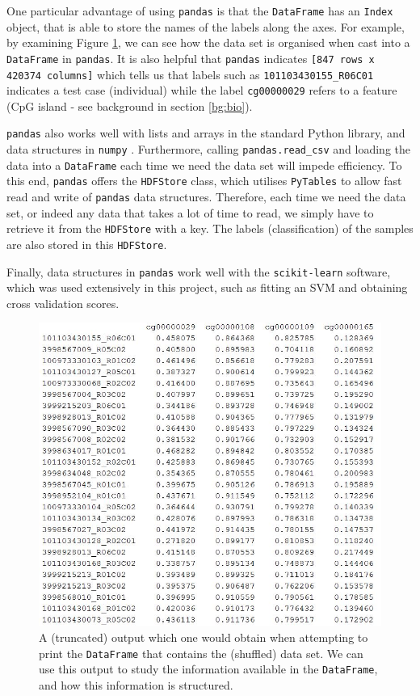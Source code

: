 \documentclass[12pt, twoside, a4paper]{report}
\begin{document}
One particular advantage of using \texttt{pandas} is that the \texttt{DataFrame} has an \texttt{Index} object, that is able to store the names of the labels along the axes. For example, by examining Figure \ref{data:pandas:example}, we can see how the data set is organised when cast into a \texttt{DataFrame} in \texttt{pandas}. It is also helpful that \texttt{pandas} indicates \texttt{[847 rows x 420374 columns]} which tells us that labels such as \texttt{101103430155\_R06C01} indicates a test case (individual) while the label \texttt{cg00000029} refers to a feature (CpG island - see background in section \ref{bg:bio}).

\texttt{pandas} also works well with lists and arrays in the standard Python library, and data structures in \texttt{numpy} \cite{RefWorks:214}. Furthermore, calling \texttt{pandas.read\_csv} and loading the data into a \texttt{DataFrame} each time we need the data set will impede efficiency. To this end, \texttt{pandas} offers the \texttt{HDFStore} class, which utilises \texttt{PyTables} \cite{pytables} to allow fast read and write of \texttt{pandas} data structures. Therefore, each time we need the data set, or indeed any data that takes a lot of time to read, we simply have to retrieve it from the \texttt{HDFStore} with a key. The labels (classification) of the samples are also stored in this \texttt{HDFStore}.

Finally, data structures in  \texttt{pandas} work well with the \texttt{scikit-learn} software, which was used extensively in this project, such as fitting an SVM and obtaining cross validation scores.

\begin{figure}
\centering
\includegraphics[scale=0.9]{images/pandas-example.JPG}
\caption{A (truncated) output which one would obtain when attempting to print the \texttt{DataFrame} that contains the (shuffled) data set. We can use this output to study the information available in the \texttt{DataFrame}, and how this information is structured.}
\label{data:pandas:example}
\end{figure}
\end{document}
